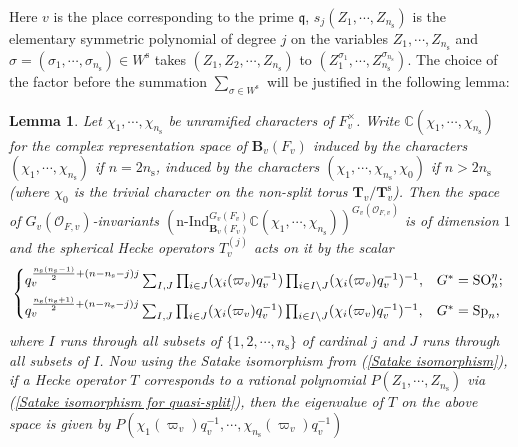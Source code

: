\documentclass[12pt,oneside,reqno]{amsart}
\theoremstyle{plain}
\newtheorem{lemma}[theorem]{Lemma}
\begin{document}
	Here  $v$ is the place corresponding to the prime $\mathfrak{q}$, $s_j(Z_1,\cdots,Z_{n_\mathrm{s}})$ is the elementary symmetric polynomial of degree $j$ on the variables $Z_1,\cdots,Z_{n_\mathrm{s}}$ and $\sigma=(\sigma_1,\cdots,\sigma_{n_\mathrm{s}})\in W^\mathrm{s}$
	takes $(Z_1,Z_2,\cdots,Z_{n_\mathrm{s}})$ to $(Z_1^{\sigma_1},\cdots,Z_{n_\mathrm{s}}^{\sigma_{n_\mathrm{s}}})$.
	The choice of the factor before the summation $\sum_{\sigma\in W^\mathrm{s}}$ will be justified in the following
	lemma:
	\begin{lemma}\label{Hecke polynomial for unramified rep}
		Let $\chi_1,\cdots,\chi_{n_\mathrm{s}}$	be unramified characters of
		$F_v^\times$. Write	$\mathbb{C}(\chi_1,\cdots,\chi_{n_\mathrm{s}})$
		for the complex representation space of	$\mathbf{B}_v(F_v)$
		induced by the characters $(\chi_1,\cdots,\chi_{n_\mathrm{s}})$
		if $n=2n_\mathrm{s}$, induced by the characters $(\chi_1,\cdots,\chi_{n_\mathrm{s}},\chi_0)$ if $n>2n_\mathrm{s}$
		(where $\chi_0$ is the trivial character on the non-split torus $\mathbf{T}_v/\mathbf{T}_v^\mathrm{s}$). Then the space of
		$G_v(\mathcal{O}_{F,v})$-invariants	$(\mathrm{n}\text{-}\mathrm{Ind}_{\mathbf{B}_v(F_v)}^{G_v(F_v)}
		\mathbb{C}
		(\chi_1,\cdots,\chi_{n_\mathrm{s}}))^{G_v(\mathcal{O}_{F,v})}$
		is of dimension $1$ and the spherical Hecke operators $T_v^{(j)}$
		acts on it by the scalar
		\[
		\begin{cases*}
			q_v^{\frac{n_\mathrm{s}(n_\mathrm{s}-1)}{2}
				+
				(n-n_\mathrm{s}-j)j}
			\sum_{I,J}
			\prod_{i\in J}
			(\chi_i(\varpi_v)q_v^{-1})
			\prod_{i\in I\backslash J}
			(\chi_i(\varpi_v)q_v^{-1})^{-1},
			&
			$G^\ast=\mathrm{SO}_n^\eta$;
			\\
			q_v^{\frac{n_\mathrm{s}(n_\mathrm{s}+1)}{2}
				+
				(n-n_\mathrm{s}-j)j}
			\sum_{I,J}
			\prod_{i\in J}
			(\chi_i(\varpi_v)q_v^{-1})
			\prod_{i\in I\backslash J}
			(\chi_i(\varpi_v)q_v^{-1})^{-1},
			&
			$G^\ast=\mathrm{Sp}_n$,
		\end{cases*}
		\]
		where $I$ runs through all subsets of $\{1,2,\cdots,n_\mathrm{s}\}$
		of cardinal $j$ and $J$ runs through all subsets of $I$. Now using the Satake isomorphism	from (\ref{Satake isomorphism}), if a Hecke operator $T$ corresponds to a rational polynomial $P(Z_1,\cdots,Z_{n_\mathrm{s}})$
		via (\ref{Satake isomorphism for quasi-split}),	then the eigenvalue of
		$T$ on the above space is given by $P(\chi_1(\varpi_v)q_v^{-1},\cdots,	\chi_{n_\mathrm{s}}(\varpi_v)q_v^{-1})$
	\end{lemma}
\end{document}
